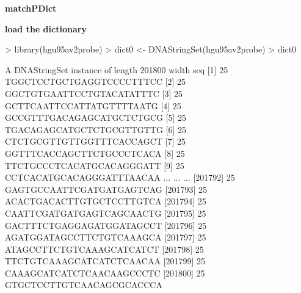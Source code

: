 \documentclass[pdf]{beamer}
\begin{document}
\begin{frame}[fragile]
\textbf{matchPDict}
\begin{block}{}
\begin{footnotesize}
\textbf{load the dictionary}
\begin{Schunk}
\begin{Sinput}
> library(hgu95av2probe)
> dict0 <- DNAStringSet(hgu95av2probe)
> dict0
\end{Sinput}
\begin{Soutput}
  A DNAStringSet instance of length 201800
         width seq
     [1]    25 TGGCTCCTGCTGAGGTCCCCTTTCC
     [2]    25 GGCTGTGAATTCCTGTACATATTTC
     [3]    25 GCTTCAATTCCATTATGTTTTAATG
     [4]    25 GCCGTTTGACAGAGCATGCTCTGCG
     [5]    25 TGACAGAGCATGCTCTGCGTTGTTG
     [6]    25 CTCTGCGTTGTTGGTTTCACCAGCT
     [7]    25 GGTTTCACCAGCTTCTGCCCTCACA
     [8]    25 TTCTGCCCTCACATGCACAGGGATT
     [9]    25 CCTCACATGCACAGGGATTTAACAA
     ...   ... ...
[201792]    25 GAGTGCCAATTCGATGATGAGTCAG
[201793]    25 ACACTGACACTTGTGCTCCTTGTCA
[201794]    25 CAATTCGATGATGAGTCAGCAACTG
[201795]    25 GACTTTCTGAGGAGATGGATAGCCT
[201796]    25 AGATGGATAGCCTTCTGTCAAAGCA
[201797]    25 ATAGCCTTCTGTCAAAGCATCATCT
[201798]    25 TTCTGTCAAAGCATCATCTCAACAA
[201799]    25 CAAAGCATCATCTCAACAAGCCCTC
[201800]    25 GTGCTCCTTGTCAACAGCGCACCCA
\end{Soutput}
\end{Schunk}
\end{footnotesize}
\end{block}
\end{frame}
\end{document}
